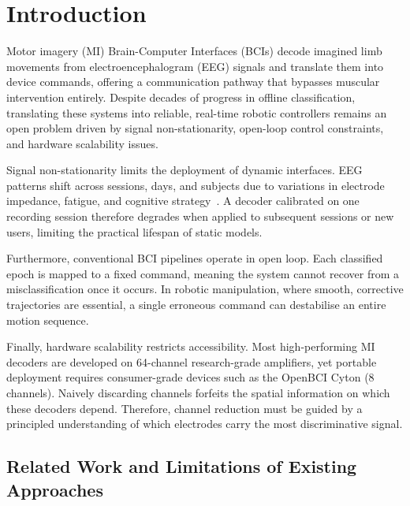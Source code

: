 \documentclass[12pt, a4paper]{article}
\begin{document}
\newpage
\begin{singlespace}
\tableofcontents
\end{singlespace}
\newpage

\section{Introduction}

Motor imagery (MI) Brain-Computer Interfaces (BCIs) decode imagined limb movements from electroencephalogram (EEG) signals and translate them into device commands, offering a communication pathway that bypasses muscular intervention entirely. Despite decades of progress in offline classification, translating these systems into reliable, real-time robotic controllers remains an open problem driven by signal non-stationarity, open-loop control constraints, and hardware scalability issues.

Signal non-stationarity limits the deployment of dynamic interfaces. EEG patterns shift across sessions, days, and subjects due to variations in electrode impedance, fatigue, and cognitive strategy~\cite{hameed2025enhancing}. A decoder calibrated on one recording session therefore degrades when applied to subsequent sessions or new users, limiting the practical lifespan of static models.

Furthermore, conventional BCI pipelines operate in open loop. Each classified epoch is mapped to a fixed command, meaning the system cannot recover from a misclassification once it occurs. In robotic manipulation, where smooth, corrective trajectories are essential, a single erroneous command can destabilise an entire motion sequence.

Finally, hardware scalability restricts accessibility. Most high-performing MI decoders are developed on 64-channel research-grade amplifiers, yet portable deployment requires consumer-grade devices such as the OpenBCI Cyton (8 channels). Naively discarding channels forfeits the spatial information on which these decoders depend. Therefore, channel reduction must be guided by a principled understanding of which electrodes carry the most discriminative signal.

\subsection{Related Work and Limitations of Existing Approaches}
\end{document}
